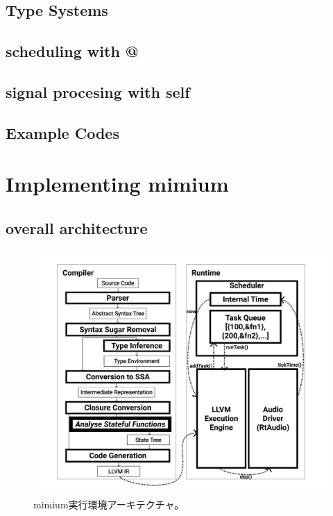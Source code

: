 \hypertarget{type-systems}{%
\section{Type Systems}\label{type-systems}}

\hypertarget{scheduling-with}{%
\section{scheduling with @}\label{scheduling-with}}

\hypertarget{signal-procesing-with-self}{%
\section{signal procesing with self}\label{signal-procesing-with-self}}

\hypertarget{example-codes}{%
\section{Example Codes}\label{example-codes}}

\hypertarget{implementing-mimium}{%
\chapter{Implementing mimium}\label{implementing-mimium}}

\hypertarget{overall-architecture}{%
\section{overall architecture}\label{overall-architecture}}

\begin{figure}
\hypertarget{fig:arch}{%
\centering
\includegraphics{img/mimium-arch-v4-affinity.pdf}
\caption{mimium実行環境アーキテクチャ。}\label{fig:arch}
}
\end{figure}

